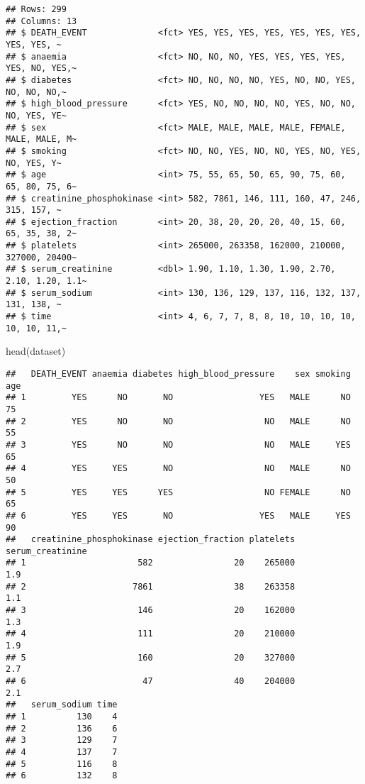 \documentclass[
]{article}
\newenvironment{Shaded}{\begin{snugshade}}{\end{snugshade}}
\newcommand{\FunctionTok}[1]{\textcolor[rgb]{0.00,0.00,0.00}{#1}}
\newcommand{\NormalTok}[1]{#1}
\begin{document}
\begin{verbatim}
## Rows: 299
## Columns: 13
## $ DEATH_EVENT              <fct> YES, YES, YES, YES, YES, YES, YES, YES, YES, ~
## $ anaemia                  <fct> NO, NO, NO, YES, YES, YES, YES, YES, NO, YES,~
## $ diabetes                 <fct> NO, NO, NO, NO, YES, NO, NO, YES, NO, NO, NO,~
## $ high_blood_pressure      <fct> YES, NO, NO, NO, NO, YES, NO, NO, NO, YES, YE~
## $ sex                      <fct> MALE, MALE, MALE, MALE, FEMALE, MALE, MALE, M~
## $ smoking                  <fct> NO, NO, YES, NO, NO, YES, NO, YES, NO, YES, Y~
## $ age                      <int> 75, 55, 65, 50, 65, 90, 75, 60, 65, 80, 75, 6~
## $ creatinine_phosphokinase <int> 582, 7861, 146, 111, 160, 47, 246, 315, 157, ~
## $ ejection_fraction        <int> 20, 38, 20, 20, 20, 40, 15, 60, 65, 35, 38, 2~
## $ platelets                <int> 265000, 263358, 162000, 210000, 327000, 20400~
## $ serum_creatinine         <dbl> 1.90, 1.10, 1.30, 1.90, 2.70, 2.10, 1.20, 1.1~
## $ serum_sodium             <int> 130, 136, 129, 137, 116, 132, 137, 131, 138, ~
## $ time                     <int> 4, 6, 7, 7, 8, 8, 10, 10, 10, 10, 10, 10, 11,~
\end{verbatim}

\begin{Shaded}
\begin{Highlighting}[]
\FunctionTok{head}\NormalTok{(dataset)}
\end{Highlighting}
\end{Shaded}

\begin{verbatim}
##   DEATH_EVENT anaemia diabetes high_blood_pressure    sex smoking age
## 1         YES      NO       NO                 YES   MALE      NO  75
## 2         YES      NO       NO                  NO   MALE      NO  55
## 3         YES      NO       NO                  NO   MALE     YES  65
## 4         YES     YES       NO                  NO   MALE      NO  50
## 5         YES     YES      YES                  NO FEMALE      NO  65
## 6         YES     YES       NO                 YES   MALE     YES  90
##   creatinine_phosphokinase ejection_fraction platelets serum_creatinine
## 1                      582                20    265000              1.9
## 2                     7861                38    263358              1.1
## 3                      146                20    162000              1.3
## 4                      111                20    210000              1.9
## 5                      160                20    327000              2.7
## 6                       47                40    204000              2.1
##   serum_sodium time
## 1          130    4
## 2          136    6
## 3          129    7
## 4          137    7
## 5          116    8
## 6          132    8
\end{verbatim}
\end{document}
